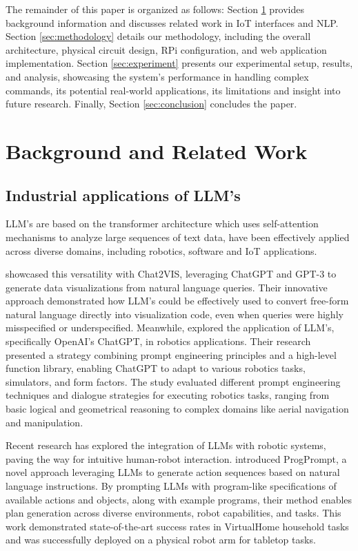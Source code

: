 \documentclass{ieeeaccess}
\begin{document}
The remainder of this paper is organized as follows: Section \ref{sec:background} provides background information and discusses related work in IoT interfaces and NLP. Section \ref{sec:methodology} details our methodology, including the overall architecture, physical circuit design, RPi configuration, and web application implementation. Section \ref{sec:experiment} presents our experimental setup, results, and analysis, showcasing the system's performance in handling complex commands, its potential real-world applications, its limitations and insight into future research. Finally, Section \ref{sec:conclusion} concludes the paper.

\section{Background and Related Work}\label{sec:background}

\subsection{Industrial applications of LLM's}
LLM's are based on the transformer architecture \cite{DBLP:journals/corr/VaswaniSPUJGKP17} which uses self-attention mechanisms to analyze large sequences of text data, have been effectively applied across diverse domains, including robotics, software and IoT applications. 

\citet{10121440} showcased this versatility with Chat2VIS, leveraging ChatGPT and GPT-3 to generate data visualizations from natural language queries. Their innovative approach demonstrated how LLM's could be effectively used to convert free-form natural language directly into visualization code, even when queries were highly misspecified or underspecified. Meanwhile, \citet{10500490} explored the application of LLM's, specifically OpenAI's ChatGPT, in robotics applications. Their research presented a strategy combining prompt engineering principles and a high-level function library, enabling ChatGPT to adapt to various robotics tasks, simulators, and form factors. The study evaluated different prompt engineering techniques and dialogue strategies for executing robotics tasks, ranging from basic logical and geometrical reasoning to complex domains like aerial navigation and manipulation.

Recent research has explored the integration of LLMs with robotic systems, paving the way for intuitive human-robot interaction. \citet{Singh2023} introduced ProgPrompt, a novel approach leveraging LLMs to generate action sequences based on natural language instructions. By prompting LLMs with program-like specifications of available actions and objects, along with example programs, their method enables plan generation across diverse environments, robot capabilities, and tasks. This work demonstrated state-of-the-art success rates in VirtualHome household tasks and was successfully deployed on a physical robot arm for tabletop tasks.
\end{document}
